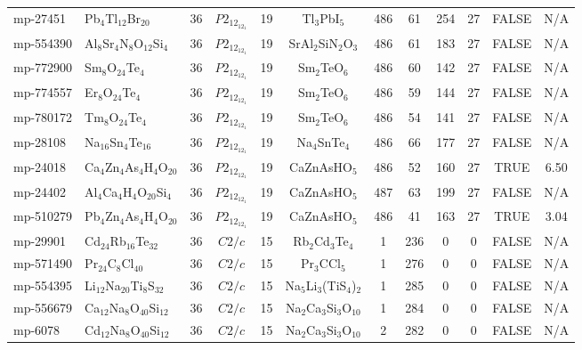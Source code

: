 {\begin{longtable}{llcccccccccc}
    mp-27451 & Pb$_{4}$Tl$_{12}$Br$_{20}$ & 36    & $P2_12_12_1$ & 19    & Tl$_{3}$PbI$_{5}$ & 486   & 61    & 254   & 27    & FALSE & N/A \\
    mp-554390 & Al$_{8}$Sr$_{4}$N$_{8}$O$_{12}$Si$_{4}$ & 36    & $P2_12_12_1$ & 19    & SrAl$_{2}$SiN$_{2}$O$_{3}$ & 486   & 61    & 183   & 27    & FALSE & N/A \\
    mp-772900 & Sm$_{8}$O$_{24}$Te$_{4}$ & 36    & $P2_12_12_1$ & 19    & Sm$_{2}$TeO$_{6}$ & 486   & 60    & 142   & 27    & FALSE & N/A \\
    mp-774557 & Er$_{8}$O$_{24}$Te$_{4}$ & 36    & $P2_12_12_1$ & 19    & Sm$_{2}$TeO$_{6}$ & 486   & 59    & 144   & 27    & FALSE & N/A \\
    mp-780172 & Tm$_{8}$O$_{24}$Te$_{4}$ & 36    & $P2_12_12_1$ & 19    & Sm$_{2}$TeO$_{6}$ & 486   & 54    & 141   & 27    & FALSE & N/A \\
    mp-28108 & Na$_{16}$Sn$_{4}$Te$_{16}$ & 36    & $P2_12_12_1$ & 19    & Na$_{4}$SnTe$_{4}$ & 486   & 66    & 177   & 27    & FALSE & N/A \\
    mp-24018 & Ca$_{4}$Zn$_{4}$As$_{4}$H$_{4}$O$_{20}$ & 36    & $P2_12_12_1$ & 19    & CaZnAsHO$_{5}$ & 486   & 52    & 160   & 27    & TRUE  & 6.50  \\
    mp-24402 & Al$_{4}$Ca$_{4}$H$_{4}$O$_{20}$Si$_{4}$ & 36    & $P2_12_12_1$ & 19    & CaZnAsHO$_{5}$ & 487   & 63    & 199   & 27    & FALSE & N/A \\
    mp-510279 & Pb$_{4}$Zn$_{4}$As$_{4}$H$_{4}$O$_{20}$ & 36    & $P2_12_12_1$ & 19    & CaZnAsHO$_{5}$ & 486   & 41    & 163   & 27    & TRUE  & 3.04  \\
    mp-29901 & Cd$_{24}$Rb$_{16}$Te$_{32}$ & 36    & $C2/c$ & 15    & Rb$_{2}$Cd$_{3}$Te$_{4}$ & 1     & 236   & 0     & 0     & FALSE & N/A \\
    mp-571490 & Pr$_{24}$C$_{8}$Cl$_{40}$ & 36    & $C2/c$ & 15    & Pr$_{3}$CCl$_{5}$ & 1     & 276   & 0     & 0     & FALSE & N/A \\
    mp-554395 & Li$_{12}$Na$_{20}$Ti$_{8}$S$_{32}$ & 36    & $C2/c$ & 15    & Na$_{5}$Li$_{3}$(TiS$_{4}$)$_{2}$ & 1     & 285   & 0     & 0     & FALSE & N/A \\
    mp-556679 & Ca$_{12}$Na$_{8}$O$_{40}$Si$_{12}$ & 36    & $C2/c$ & 15    & Na$_{2}$Ca$_{3}$Si$_{3}$O$_{10}$ & 1     & 284   & 0     & 0     & FALSE & N/A \\
    mp-6078 & Cd$_{12}$Na$_{8}$O$_{40}$Si$_{12}$ & 36    & $C2/c$ & 15    & Na$_{2}$Ca$_{3}$Si$_{3}$O$_{10}$ & 2     & 282   & 0     & 0     & FALSE & N/A \\

\end{longtable}}
